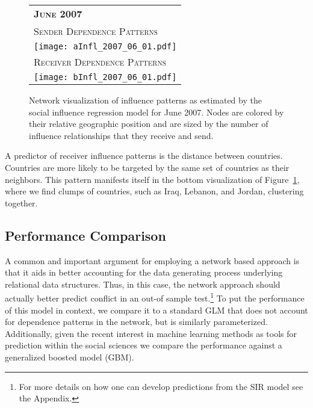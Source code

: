 \vspace{-2mm}
\begin{figure}[ht]
	\centering
	\begin{tabular}{l}
		\scshape{\textbf{June 2007}} \\
		\scshape{\;\;\;\; Sender Dependence Patterns} \\
		\texttt{[image: aInfl\_2007\_06\_01.pdf]} \\
		\scshape{\;\;\;\; Receiver Dependence Patterns} \\
		\texttt{[image: bInfl\_2007\_06\_01.pdf]} \\
	\end{tabular}
	\caption{Network visualization of influence patterns as estimated by the social influence regression model for June 2007. Nodes are colored by their relative geographic position and are sized by the number of influence relationships that they receive and send.}
	\label{fig:inflRel}
\end{figure}
\FloatBarrier

A predictor of receiver influence patterns is the distance between countries. Countries are more likely to be targeted by the same set of countries as their neighbors. This pattern manifests itself in the bottom visualization of Figure~\ref{fig:inflRel}, where we find clumps of countries, such as Iraq, Lebanon, and Jordan, clustering together.

\subsection*{Performance Comparison}

A common and important argument for employing a network based approach is that it aids in better accounting for the data generating process underlying relational data structures. Thus, in this case, the network approach should actually better predict conflict in an out-of sample test.\footnote{For more details on how one can develop predictions from the SIR model see the Appendix.} To put the performance of this model in context, we compare it to a standard GLM that does not account for dependence patterns in the network, but is similarly parameterized. Additionally, given the recent interest in machine learning methods as tools for prediction within the social sciences we compare the performance against a generalized boosted model (GBM).


